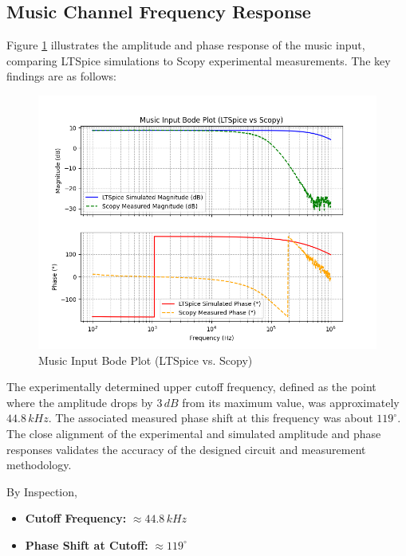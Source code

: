 \documentclass[12pt]{article}
\begin{document}
\subsection{Music Channel Frequency Response}

Figure \ref{fig:music_bode} illustrates the amplitude and phase response of the music input, comparing LTSpice simulations to Scopy experimental measurements. The key findings are as follows:

\begin{figure}[H]
	\centering
	\includegraphics[width=1.0\textwidth]{dp_music}
	\caption{Music Input Bode Plot (LTSpice vs. Scopy)}
	\label{fig:music_bode}
\end{figure}

The experimentally determined upper cutoff frequency, defined as the point where
the amplitude drops by $3\,dB$ from its maximum value, was approximately
$44.8\,kHz$. The associated measured phase shift at this frequency was about
$119^\circ$. The close alignment of the experimental and simulated amplitude and phase responses validates the accuracy of the designed circuit and measurement methodology.

By Inspection,
\begin{itemize}
	\item \textbf{Cutoff Frequency:} $\approx 44.8\,kHz$
	\item \textbf{Phase Shift at Cutoff:} $\approx 119^\circ$
\end{itemize}
\end{document}
